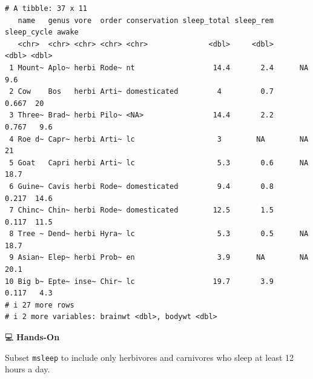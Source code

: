 \documentclass[
  letterpaper,
  DIV=11,
  numbers=noendperiod]{scrreprt}
\begin{document}
\begin{tcolorbox}
\begin{verbatim}
# A tibble: 37 x 11
   name   genus vore  order conservation sleep_total sleep_rem sleep_cycle awake
   <chr>  <chr> <chr> <chr> <chr>              <dbl>     <dbl>       <dbl> <dbl>
 1 Mount~ Aplo~ herbi Rode~ nt                  14.4       2.4      NA       9.6
 2 Cow    Bos   herbi Arti~ domesticated         4         0.7       0.667  20  
 3 Three~ Brad~ herbi Pilo~ <NA>                14.4       2.2       0.767   9.6
 4 Roe d~ Capr~ herbi Arti~ lc                   3        NA        NA      21  
 5 Goat   Capri herbi Arti~ lc                   5.3       0.6      NA      18.7
 6 Guine~ Cavis herbi Rode~ domesticated         9.4       0.8       0.217  14.6
 7 Chinc~ Chin~ herbi Rode~ domesticated        12.5       1.5       0.117  11.5
 8 Tree ~ Dend~ herbi Hyra~ lc                   5.3       0.5      NA      18.7
 9 Asian~ Elep~ herbi Prob~ en                   3.9      NA        NA      20.1
10 Big b~ Epte~ inse~ Chir~ lc                  19.7       3.9       0.117   4.3
# i 27 more rows
# i 2 more variables: brainwt <dbl>, bodywt <dbl>
\end{verbatim}

\end{tcolorbox}

💻 \textbf{Hands-On}

Subset \texttt{msleep} to include only herbivores and carnivores who
sleep at least 12 hours a day.
\end{document}

